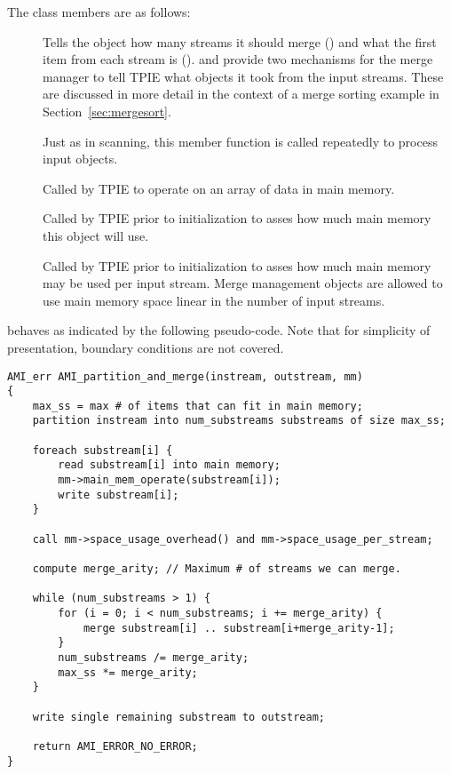 The class members are as follows:

\begin{description}
\item[] Tells the object how many streams it should
  merge () and what the first item from each stream is
  ().  and  provide two
  mechanisms for the merge manager to tell TPIE what objects it took
  from the input streams. These are discussed in more detail in 
  the context of a merge sorting example in Section~\ref{sec:mergesort}.
\item[]
Just as in scanning, this member function is called repeatedly to process
input objects.
\item[]
Called by TPIE to operate on an array of data in main memory.
\item[]
Called by TPIE prior to initialization to asses how much main memory this
object will use.
\item[]
Called by TPIE prior to initialization to asses how much main memory may be
used per input stream. Merge management objects are allowed to use main
memory space linear in the number of input streams.
\end{description}

 behaves as indicated by the following
pseudo-code. Note that for simplicity of presentation, boundary conditions are not covered.

\begin{verbatim}
AMI_err AMI_partition_and_merge(instream, outstream, mm)
{
    max_ss = max # of items that can fit in main memory;
    partition instream into num_substreams substreams of size max_ss;

    foreach substream[i] {
        read substream[i] into main memory;
        mm->main_mem_operate(substream[i]);
        write substream[i];
    }

    call mm->space_usage_overhead() and mm->space_usage_per_stream;
    
    compute merge_arity; // Maximum # of streams we can merge.     

    while (num_substreams > 1) {
        for (i = 0; i < num_substreams; i += merge_arity) {
            merge substream[i] .. substream[i+merge_arity-1];
        }
        num_substreams /= merge_arity;
        max_ss *= merge_arity;
    }

    write single remaining substream to outstream;
        
    return AMI_ERROR_NO_ERROR;
}
\end{verbatim}


